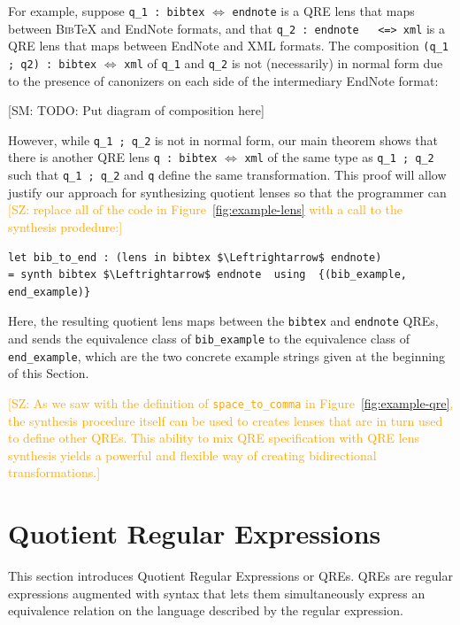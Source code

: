 \documentclass{svproc}
\newcommand{\cd}[1]{\lstinline[backgroundcolor=\color{white}]$#1$}
\newcommand{\FINISH}[3]{\ifdraft\textcolor{#1}{[#2: #3]}\fi}
\newcommand{\saz}[1]{\FINISH{orange}{SZ}{#1}}
\newcommand{\sam}[1]{\FINISH{dkpurple}{SM}{#1}}
\newcommand{\bibtex}{\textsc{Bib}\TeX{}}
\begin{document}
For example, suppose \cd{q_1 : bibtex} $\Leftrightarrow$ \cd{endnote} is a QRE
lens that maps between \bibtex{} and EndNote formats, and that \cd{q_2 : endnote
  <=> xml} is a QRE lens that maps between EndNote and XML formats. The
composition \cd{(q_1 ; q2) : bibtex} $\Leftrightarrow$ \cd{xml} of \cd{q_1} and
\cd{q_2} is not (necessarily) in normal form due to the presence of canonizers
on each side of the intermediary EndNote format:

\sam{TODO: Put diagram of composition here}

\noindent However, while \cd{q_1 ; q_2} is not in normal form, our main theorem
shows that there is another QRE lens \cd{q : bibtex} $\Leftrightarrow$ \cd{xml} of the same type as
\cd{q_1 ; q_2} such that \cd{q_1 ; q_2} and \cd{q} define the same
transformation. This proof will allow justify our approach for synthesizing
quotient lenses so that the programmer can \saz{replace all of the code in
  Figure~\ref{fig:example-lens} with a call to the synthesis prodedure:}

\begin{lstlisting}
let bib_to_end : (lens in bibtex $\Leftrightarrow$ endnote) 
= synth bibtex $\Leftrightarrow$ endnote  using  {(bib_example, end_example)}
\end{lstlisting}
\noindent Here, the resulting  quotient lens maps between the \cd{bibtex} and
\cd{endnote} QREs, and sends the equivalence class of \cd{bib_example} to
the equivalence class of \cd{end_example}, which are the two concrete example
strings given at the beginning of this Section.

\saz{
As we saw with the definition of \cd{space_to_comma} in
Figure~\ref{fig:example-qre}, the synthesis procedure itself can be used to
creates lenses that are in turn used to define other QREs.  This ability to mix
QRE specification with QRE lens synthesis yields a powerful and flexible way of
creating bidirectional transformations.}


\section{Quotient Regular Expressions}
\label{QRE}

This section introduces Quotient Regular Expressions or QREs. QREs are regular
expressions augmented with syntax that lets them simultaneously express an
equivalence relation on the language described by the regular expression.
\end{document}
